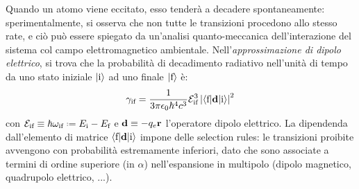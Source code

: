 Quando un atomo viene eccitato, esso tenderà a decadere spontaneamente: sperimentalmente, si osserva che non tutte le transizioni procedono allo stesso rate, e ciò può essere spiegato da un'analisi quanto-meccanica dell'interazione del sistema col campo elettromagnetico ambientale. Nell'\textit{approssimazione di dipolo elettrico}\footnotemark, si trova che la probabilità di decadimento radiativo nell'unità di tempo da uno stato iniziale $ \ket{\text{i}} $ ad uno finale $ \ket{\text{f}} $ è:
\begin{equation}
	\gamma_\text{if} = \frac{1}{3\pi \epsilon_0 \hbar^4 c^3} \mathcal{E}_\text{if}^3 \left\lvert\braket{\text{f} | \mathbf{d} | \text{i}}\right\rvert^2
	\label{eq:electron-trans-prob}
\end{equation}
con $ \mathcal{E}_\text{if} \equiv \hbar \omega_\text{if} \defeq E_\text{i} - E_\text{f} $ e $ \mathbf{d} \equiv - q_e \mathbf{r} $ l'operatore dipolo elettrico. La dipendenda dall'elemento di matrice $ \braket{\text{f} | \mathbf{d} | \text{i}} $ impone delle selection rules: le transizioni proibite avvengono con probabilità estremamente inferiori, dato che sono associate a termini di ordine superiore (in $ \alpha $) nell'espansione in multipolo (dipolo magnetico, quadrupolo elettrico, ...).


